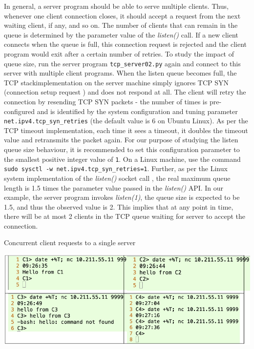 \begin{multicols}{2}
In general, a server program should be able to serve multiple clients. Thus, whenever one client connection closes, it should accept a request from the next waiting client, if any, and so on. The number of clients that can remain in the queue is determined by the parameter value of the \textit{listen()} call. If a new client connects when the queue is full, this connection request is rejected and the client program would exit after a certain number of retries. To study the impact of queue size, run the server program \texttt{tcp\_server02.py} \cite{art1-key17} again and connect to this server with multiple client programs. When the listen queue becomes full, the TCP stack\break implementation on the server machine simply ignores TCP SYN (connection setup request \cite{art1-key09}\cite{art1-key11}) and does not respond at all. The client will retry the connection by resending TCP SYN packets - the number of times is pre-configured and is identified by the system configuration and tuning parameter \texttt{net.ipv4.tcp\_syn\_retries} (the default value is 6 on Ubuntu Linux). As per the TCP timeout implementation, each time it sees a timeout, it doubles the timeout value \cite{art1-key09} and retransmits the packet again. For our purpose of studying the listen queue size behaviour, it is recommended to set this configuration parameter to the smallest positive integer value of \texttt{1}. On a Linux machine, use the command \texttt{sudo sysctl -w net.ipv4.tcp\_syn\_retries=1}. Further, as per the Linux system implementation of the \textit{listen()} socket call \cite{art1-key18}, the real maximum queue length is 1.5 times the parameter value passed in the \textit{listen()} API. In our example, the server program invokes \textit{listen(1)}, the queue size is expected to be 1.5, and thus the observed value is 2. This implies that at any point in time, there will be at most 2 clients in the TCP queue waiting for server to accept the connection.
\end{multicols}

\begin{table}[H]

\vspace{-.9cm}

\centering
\caption{Concurrent client requests to a single server}\label{tab04}
\includegraphics[scale=2.28]{src/Figures/chap1/tab04.jpg}
\end{table}

